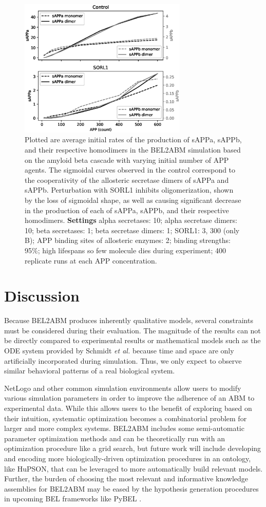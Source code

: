 \documentclass{bioinfo}
\begin{document}
\begin{figure}[!tpb]%
\includegraphics[width=8cm]{figure1.eps}
\caption{Plotted are average initial rates of the production of sAPPa, sAPPb, and their respective homodimers in the BEL2ABM simulation based on the amyloid beta cascade with varying initial number of APP agents. The sigmoidal curves observed in the control correspond to the cooperativity of the allosteric secretase dimers of sAPPa and sAPPb. Perturbation with SORL1 inhibits oligomerization, shown by the loss of sigmoidal shape, as well as causing significant decrease in the production of each of sAPPa, sAPPb, and their respective homodimers.
\textbf{Settings} alpha secretases: 10; alpha secretase dimers: 10; beta secretases: 1; 
beta secretase dimers: 1; SORL1: 3, 300 (only B); APP binding sites of allosteric enzymes: 2; binding 
strengths: 95\%; high lifespans so few molecule dies during experiment; 400 replicate runs at each APP 
concentration.}
\label{fig:01}
\end{figure}

\section{Discussion}
Because BEL2ABM produces inherently qualitative models, several constraints must be considered during their evaluation. The magnitude of the results can not be directly compared to experimental results or mathematical models such as the ODE system provided by Schmidt {\it et al.} because time and space are only artificially incorporated during simulation. Thus, we only expect to observe similar behavioral patterns of a real biological system.

NetLogo and other common simulation environments allow users to modify various simulation parameters in order to improve the adherence of an ABM to experimental data. While this allows users to the benefit of exploring based on their intuition, systematic optimization becomes a combinatorial problem for larger and more complex systems. BEL2ABM includes some semi-automatic parameter optimization methods and can be theoretically run with an optimization procedure like a grid search, but future work will include developing and encoding more biologically-driven optimization procedures in an ontology, like HuPSON, that can be leveraged to more automatically build relevant models. Further, the burden of choosing the most relevant and informative knowledge assemblies for BEL2ABM may be eased by the hypothesis generation procedures in upcoming BEL frameworks like PyBEL \citep{Hoyt17}.
\end{document}
